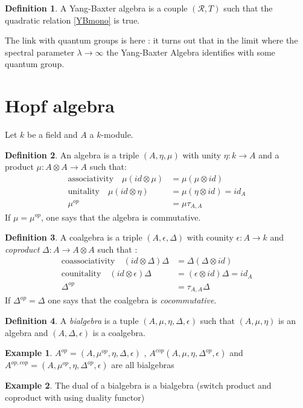 \documentclass{article}
\theoremstyle{definition}
\newtheorem{ex}{Example}[section]
\newtheorem{Def}{Definition}[section]
\begin{document}
\begin{Def} A Yang-Baxter algebra is a couple $(\mathcal{R}, T)$ such that the quadratic relation \ref{YBmono} is true.
\end{Def} The link with quantum groups is here : it turns out that in the limit where the spectral parameter $\lambda\to\infty$ the Yang-Baxter Algebra identifies with some quantum group. 
\section{Hopf algebra}
Let $k$ be a field and $A$ a $k$-module.\begin{Def} An algebra is a triple $(A,\eta,\mu)$  with unity $\eta : k\to A$ and a product $\mu: A\otimes A\to A$ such that: 
\begin{align*} 
\mbox{associativity}\quad\mu(id\otimes\mu) & =\mu(\mu\otimes id) \\
\mbox{unitality}\quad\mu(id\otimes\eta) & =\mu(\eta\otimes id)=id_A \\
\mu^{op} & =\mu\tau_{A,A}
\end{align*} 
If $\mu=\mu^{op}$, one says that the algebra is commutative.
\end{Def}
\begin{Def} A coalgebra is a triple $(A,\epsilon,\Delta)$ with counity $\epsilon : A\to k $ and \textit{coproduct} $\Delta : A\to A\otimes A $ such that : \begin{align*} 
\mbox{coassociativity}\quad (id\otimes\Delta)\Delta & =\Delta(\Delta\otimes id) \\
\mbox{counitality}\quad (id\otimes\epsilon)\Delta & =(\epsilon\otimes id)\Delta=id_{A} \\
\Delta^{op} & =\tau_{A,A}\Delta
\end{align*}
If $\Delta^{op}=\Delta$ one says that the coalgebra is \textit{cocommutative}.
\end{Def}
\begin{Def} A \textit{bialgebra} is a tuple $(A,\mu,\eta,\Delta,\epsilon)$ such that $(A,\mu,\eta)$ is an algebra and  $(A,\Delta,\epsilon)$ is a coalgebra.
\end{Def}
\begin{ex}
$A^{op}=(A,\mu^{op},\eta,\Delta,\epsilon)$ , $A^{cop} (A,\mu,\eta,\Delta^{op},\epsilon)$ and $A^{op,cop}=(A,\mu^{op},\eta,\Delta^{op},\epsilon)$ are all bialgebras
\end{ex}
\begin{ex} The dual of a bialgebra is a bialgebra (switch product and coproduct with using duality functor)
\end{ex}
\end{document}
